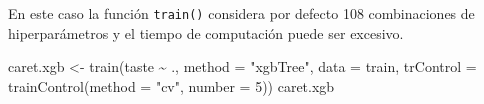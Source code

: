 \documentclass[
]{book}
\newenvironment{Shaded}{\begin{snugshade}}{\end{snugshade}}
\newcommand{\AttributeTok}[1]{\textcolor[rgb]{0.77,0.63,0.00}{#1}}
\newcommand{\DecValTok}[1]{\textcolor[rgb]{0.00,0.00,0.81}{#1}}
\newcommand{\FunctionTok}[1]{\textcolor[rgb]{0.00,0.00,0.00}{#1}}
\newcommand{\NormalTok}[1]{#1}
\newcommand{\OtherTok}[1]{\textcolor[rgb]{0.56,0.35,0.01}{#1}}
\newcommand{\SpecialCharTok}[1]{\textcolor[rgb]{0.00,0.00,0.00}{#1}}
\newcommand{\StringTok}[1]{\textcolor[rgb]{0.31,0.60,0.02}{#1}}
\theoremstyle{break}
\theoremstyle{definition}
\theoremstyle{definition}
\theoremstyle{definition}
\theoremstyle{definition}
\theoremstyle{remark}
\begin{document}
En este caso la función \texttt{train()} considera por defecto 108 combinaciones de hiperparámetros y el tiempo de computación puede ser excesivo.

\begin{Shaded}
\begin{Highlighting}[]
\NormalTok{caret.xgb }\OtherTok{\textless{}{-}} \FunctionTok{train}\NormalTok{(taste }\SpecialCharTok{\textasciitilde{}}\NormalTok{ ., }\AttributeTok{method =} \StringTok{"xgbTree"}\NormalTok{, }\AttributeTok{data =}\NormalTok{ train,}
                   \AttributeTok{trControl =} \FunctionTok{trainControl}\NormalTok{(}\AttributeTok{method =} \StringTok{"cv"}\NormalTok{, }\AttributeTok{number =} \DecValTok{5}\NormalTok{))}
\NormalTok{caret.xgb}
\end{Highlighting}
\end{Shaded}
\end{document}
